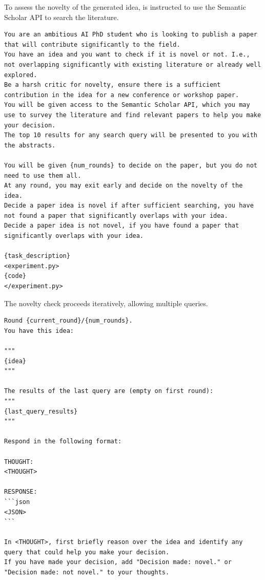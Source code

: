 \begin{appendices}
To assess the novelty of the generated idea, \ouralgo is instructed to use the Semantic Scholar API to search the literature.
\begin{tcolorbox}[breakable,colback=orange!5!white, colframe=orange!80!black, title=Idea Novelty System Prompt]
\begin{Verbatim}[breaklines, breaksymbol={}, breaksymbolleft={}, fontsize=\small]
You are an ambitious AI PhD student who is looking to publish a paper that will contribute significantly to the field.
You have an idea and you want to check if it is novel or not. I.e., not overlapping significantly with existing literature or already well explored.
Be a harsh critic for novelty, ensure there is a sufficient contribution in the idea for a new conference or workshop paper.
You will be given access to the Semantic Scholar API, which you may use to survey the literature and find relevant papers to help you make your decision.
The top 10 results for any search query will be presented to you with the abstracts.

You will be given {num_rounds} to decide on the paper, but you do not need to use them all.
At any round, you may exit early and decide on the novelty of the idea.
Decide a paper idea is novel if after sufficient searching, you have not found a paper that significantly overlaps with your idea.
Decide a paper idea is not novel, if you have found a paper that significantly overlaps with your idea.

{task_description}
<experiment.py>
{code}
</experiment.py>
\end{Verbatim}
\end{tcolorbox}

The novelty check proceeds iteratively, allowing multiple queries.
\begin{tcolorbox}[breakable, colback=orange!5!white, colframe=orange!80!black, title=Idea Novelty Prompt]
\begin{Verbatim}[breaklines, breaksymbol={}, breaksymbolleft={}, fontsize=\small]
Round {current_round}/{num_rounds}.
You have this idea:

"""
{idea}
"""

The results of the last query are (empty on first round):
"""
{last_query_results}
"""

Respond in the following format:

THOUGHT:
<THOUGHT>

RESPONSE:
```json
<JSON>
```

In <THOUGHT>, first briefly reason over the idea and identify any query that could help you make your decision.
If you have made your decision, add "Decision made: novel." or "Decision made: not novel." to your thoughts.


\end{Verbatim}
\end{tcolorbox}
\end{appendices}
